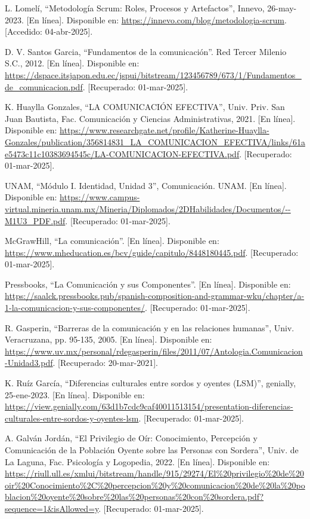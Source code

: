 \begin{thebibliography}{99}
    L. Lomelí, “Metodología Scrum: Roles, Procesos y Artefactos”, Innevo, 26-may-2023. [En línea]. Disponible en: \url{https://innevo.com/blog/metodologia-scrum}. [Accedido: 04-abr-2025].

    D. V. Santos Garcia, “Fundamentos de la comunicación”. Red Tercer Milenio S.C., 2012. [En línea]. Disponible en: \url{https://dspace.itsjapon.edu.ec/jspui/bitstream/123456789/673/1/Fundamentos_de_comunicacion.pdf}. [Recuperado: 01-mar-2025].

    K. Huaylla Gonzales, “LA COMUNICACIÓN EFECTIVA”, Univ. Priv. San Juan Bautista, Fac. Comunicación y Ciencias Administrativas, 2021. [En línea]. Disponible en: \url{https://www.researchgate.net/profile/Katherine-Huaylla-Gonzales/publication/356814831_LA_COMUNICACION_EFECTIVA/links/61ae5473c11c10383694545c/LA-COMUNICACION-EFECTIVA.pdf}. [Recuperado: 01-mar-2025].

    UNAM, “Módulo I. Identidad, Unidad 3”, Comunicación. UNAM. [En línea]. Disponible en: \url{https://www.campus-virtual.mineria.unam.mx/Mineria/Diplomados/2DHabilidades/Documentos/--M1U3_PDF.pdf}. [Recuperado: 01-mar-2025].

    McGrawHill, “La comunicación”. [En línea]. Disponible en: \url{https://www.mheducation.es/bcv/guide/capitulo/8448180445.pdf}. [Recuperado: 01-mar-2025].

    Pressbooks, “La Comunicación y sus Componentes”. [En línea]. Disponible en: \url{https://saalck.pressbooks.pub/spanish-composition-and-grammar-wku/chapter/a-1-la-comunicacion-y-sus-componentes/}. [Recuperado: 01-mar-2025].

    R. Gasperin, “Barreras de la comunicación y en las relaciones humanas”, Univ. Veracruzana, pp. 95-135, 2005. [En línea]. Disponible en: \url{https://www.uv.mx/personal/rdegasperin/files/2011/07/Antologia.Comunicacion-Unidad3.pdf}. [Recuperado: 20-mar-2021].

    K. Ruíz García, “Diferencias culturales entre sordos y oyentes (LSM)”, genially, 25-ene-2023. [En línea]. Disponible en: \url{https://view.genially.com/63d1b7cdc9caf40011513154/presentation-diferencias-culturales-entre-sordos-y-oyentes-lsm}. [Recuperado: 01-mar-2025].

    A. Galván Jordán, “El Privilegio de Oír: Conocimiento, Percepción y Comunicación de la Población Oyente sobre las Personas con Sordera”, Univ. de La Laguna, Fac. Psicología y Logopedia, 2022. [En línea]. Disponible en: \url{https://riull.ull.es/xmlui/bitstream/handle/915/29274/El%20privilegio%20de%20oir%20Conocimiento%2C%20percepcion%20y%20comunicacion%20de%20la%20poblacion%20oyente%20sobre%20las%20personas%20con%20sordera.pdf?sequence=1&isAllowed=y}. [Recuperado: 01-mar-2025].


\end{thebibliography}
